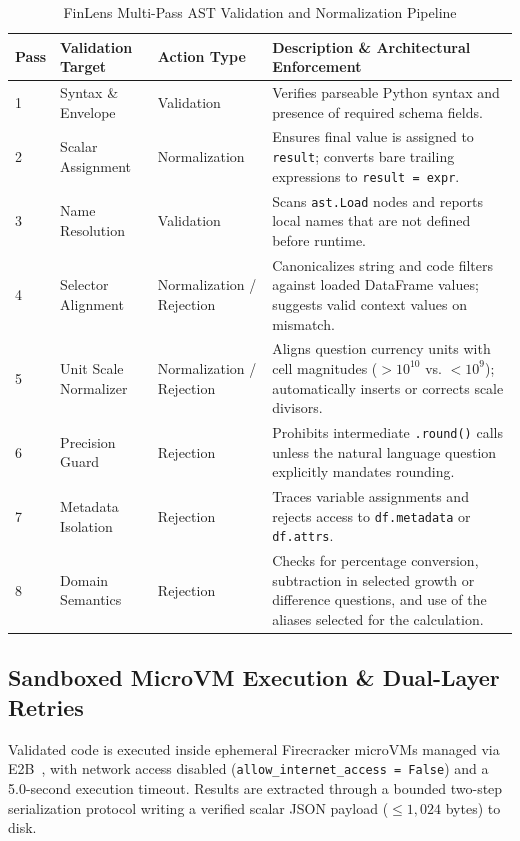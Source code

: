 \documentclass[10pt,journal,compsoc]{IEEEtran}
\begin{document}
\begin{table}[!t]
\centering
\caption{FinLens Multi-Pass AST Validation and Normalization Pipeline}
\label{tab:ast_passes}
\begin{tabular}{lllp{7.5cm}}
\toprule
\textbf{Pass} & \textbf{Validation Target} & \textbf{Action Type} & \textbf{Description \& Architectural Enforcement} \\
\midrule
1 & Syntax \& Envelope & Validation & Verifies parseable Python syntax and presence of required schema fields. \\
2 & Scalar Assignment & Normalization & Ensures final value is assigned to \texttt{result}; converts bare trailing expressions to \texttt{result = expr}. \\
3 & Name Resolution & Validation & Scans \texttt{ast.Load} nodes and reports local names that are not defined before runtime. \\
4 & Selector Alignment & Normalization / Rejection & Canonicalizes string and code filters against loaded DataFrame values; suggests valid context values on mismatch. \\
5 & Unit Scale Normalizer & Normalization / Rejection & Aligns question currency units with cell magnitudes ($>10^{10}$ vs. $<10^9$); automatically inserts or corrects scale divisors. \\
6 & Precision Guard & Rejection & Prohibits intermediate \texttt{.round()} calls unless the natural language question explicitly mandates rounding. \\
7 & Metadata Isolation & Rejection & Traces variable assignments and rejects access to \texttt{df.metadata} or \texttt{df.attrs}. \\
8 & Domain Semantics & Rejection & Checks for percentage conversion, subtraction in selected growth or difference questions, and use of the aliases selected for the calculation. \\
\bottomrule
\end{tabular}
\end{table}

\subsection{Sandboxed MicroVM Execution \& Dual-Layer Retries}
Validated code is executed inside ephemeral Firecracker microVMs managed via E2B~\cite{agache2020firecracker}, with network access disabled (\texttt{allow\_internet\_access = False}) and a 5.0-second execution timeout. Results are extracted through a bounded two-step serialization protocol writing a verified scalar JSON payload ($\le 1,024$ bytes) to disk.
\end{document}
